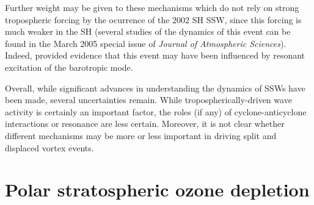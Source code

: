 Further weight may be given to these mechanisms which do not rely on strong
tropospheric forcing by the ocurrence of the 2002 SH SSW, since this forcing is
much weaker in the SH (several studies of the dynamics of this event can be
found in the March 2005 special issue of \emph{Journal of Atmospheric
  Sciences}). Indeed, \citet{Esler2006} provided evidence that this event may
have been influenced by resonant excitation of the barotropic mode. 


Overall, while significant advances in understanding the dynamics of SSWs have
been made, several uncertainties remain. While tropospherically-driven wave
activity is certainly an important factor, the roles (if any) of
cyclone-anticyclone interactions or resonance are less certain. Moreover, it is
not clear whether different mechanisms may be more or less important in driving
split and displaced vortex events.


\section{Polar stratospheric ozone depletion}
\label{sec:polar-strat-ozone}

